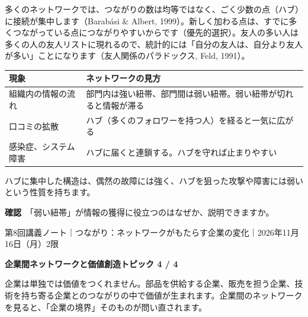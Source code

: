 \documentclass[paper=a4paper,fontsize=10pt,line_length=170mm,number_of_lines=46,baselineskip=1.6zw]{jlreq}
\newcommand\topichead[4]{%
  {\sffamily\footnotesize\color{grayt}#1\par}\vspace{1.5mm}
  {\sffamily\bfseries\LARGE #4}\hfill\colorbox{accent}{\sffamily\footnotesize\bfseries トピック #2 / #3}\par
  \vspace{1.2mm}{\color{ink}\hrule height 0.6pt}\vspace{3mm}}
\newcommand\subhead[1]{\par\vspace{2.6mm}{\sffamily\bfseries\large #1}\par\vspace{1.3mm}}
\begin{document}
\subhead{スケールフリーとハブ}
多くのネットワークでは、つながりの数は均等ではなく、ごく少数の点（ハブ）に接続が集中します（Barabási \& Albert, 1999）。新しく加わる点は、すでに多くつながっている点につながりやすいからです（優先的選択）。友人の多い人は多くの人の友人リストに現れるので、統計的には「自分の友人は、自分より友人が多い」ことになります（友人関係のパラドックス, Feld, 1991）。\par\vspace{1.2mm}
\subhead{共通する構造}
\begin{center}\small\renewcommand{\arraystretch}{1.15}\setlength{\tabcolsep}{1.5mm}
\begin{tabular}{|p{38.0mm}|p{125.0mm}|}\arrayrulecolor{rulec}\hline
\rowcolor{papertwo}\sffamily\bfseries 現象 & \sffamily\bfseries ネットワークの見方\\\hline
組織内の情報の流れ & 部門内は強い紐帯、部門間は弱い紐帯。弱い紐帯が切れると情報が滞る\\\hline
口コミの拡散 & ハブ（多くのフォロワーを持つ人）を経ると一気に広がる\\\hline
感染症、システム障害 & ハブに届くと連鎖する。ハブを守れば止まりやすい\\\hline
\end{tabular}\end{center}\vspace{0.5mm}
ハブに集中した構造は、偶然の故障には強く、ハブを狙った攻撃や障害には弱いという性質を持ちます。\par\vspace{1.2mm}
\begin{checkbox}
{\sffamily\bfseries 確認}　「弱い紐帯」が情報の獲得に役立つのはなぜか、説明できますか。\par
\end{checkbox}
\clearpage
\topichead{第8回講義ノート｜つながり：ネットワークがもたらす企業の変化｜2026年11月16日（月）2限}{4}{4}{企業間ネットワークと価値創造}
企業は単独では価値をつくれません。部品を供給する企業、販売を担う企業、技術を持ち寄る企業とのつながりの中で価値が生まれます。企業間のネットワークを見ると、「企業の境界」そのものが問い直されます。\par\vspace{1.2mm}
\end{document}
